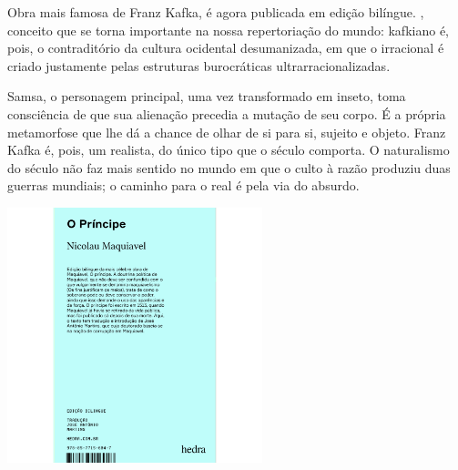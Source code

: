 \hspace*{-7cm}\hrulefill\hspace*{-7cm}

\medskip

\noindent{}Obra mais famosa de Franz Kafka, {} é agora publicada em edição bilíngue. , conceito que se torna importante na nossa repertoriação do mundo: kafkiano é, pois, o contraditório da cultura ocidental desumanizada, em que o irracional é criado justamente pelas estruturas burocráticas ultrarracionalizadas.

Samsa, o personagem principal, uma vez transformado em inseto, toma consciência de que sua alienação precedia a mutação de seu corpo. É a própria metamorfose que lhe dá a chance de olhar de si para si, sujeito e objeto. Franz Kafka é, pois, um realista, do único tipo que o século  comporta. O naturalismo do século  não faz mais sentido no mundo em que o culto à razão produziu duas guerras mundiais; o caminho para o real é pela via do absurdo.


\vfill

\hspace*{-.4cm}\begin{minipage}[c]{.5\linewidth}
\small{
{}}
\end{minipage}


\pagebreak %

\begin{center}
\hspace*{-3.6cm}
\hspace*{3.1cm}\includegraphics[width=74mm]{./grid/maquiavel.jpg}
\end{center}

